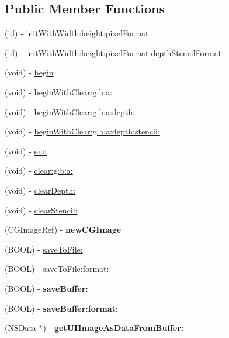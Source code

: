 \subsection*{Public Member Functions}
\begin{DoxyCompactItemize}
\item 
(id) -\/ \hyperlink{class_c_c_render_texture_a77581a363d799f8809e41af16b065430}{init\-With\-Width\-:height\-:pixel\-Format\-:}
\item 
(id) -\/ \hyperlink{class_c_c_render_texture_abec7e1e6f1d8364ede1ec35b80e8676b}{init\-With\-Width\-:height\-:pixel\-Format\-:depth\-Stencil\-Format\-:}
\item 
(void) -\/ \hyperlink{class_c_c_render_texture_a6ff1e0f1170a671213fa2318fe2cf9c2}{begin}
\item 
(void) -\/ \hyperlink{class_c_c_render_texture_a3f4c27a273867fccdba169c229c91d25}{begin\-With\-Clear\-:g\-:b\-:a\-:}
\item 
(void) -\/ \hyperlink{class_c_c_render_texture_a597c8f5c870d1e3ac01ec59ca116eaa8}{begin\-With\-Clear\-:g\-:b\-:a\-:depth\-:}
\item 
(void) -\/ \hyperlink{class_c_c_render_texture_abe5bc47d733370376b72b95f76b49b1b}{begin\-With\-Clear\-:g\-:b\-:a\-:depth\-:stencil\-:}
\item 
(void) -\/ \hyperlink{class_c_c_render_texture_a79e67a9ab6e86f790466d46ec20c7a7e}{end}
\item 
(void) -\/ \hyperlink{class_c_c_render_texture_a9be1084ec3e9296b555f3c970670aa1f}{clear\-:g\-:b\-:a\-:}
\item 
(void) -\/ \hyperlink{class_c_c_render_texture_ab970c383f371252cc9f016296189bbb5}{clear\-Depth\-:}
\item 
(void) -\/ \hyperlink{class_c_c_render_texture_a7cd182ca15a0c73135a2056af3bbe9e4}{clear\-Stencil\-:}
\item 
\hypertarget{class_c_c_render_texture_a1235f6cd1189581d0edca90a84737883}{(C\-G\-Image\-Ref) -\/ {\bfseries new\-C\-G\-Image}}\label{class_c_c_render_texture_a1235f6cd1189581d0edca90a84737883}

\item 
(B\-O\-O\-L) -\/ \hyperlink{class_c_c_render_texture_a6c6c723493a1ec9578b2ca4f27774ee7}{save\-To\-File\-:}
\item 
(B\-O\-O\-L) -\/ \hyperlink{class_c_c_render_texture_aad1bc8417cce99a3d936edb4e1a302b1}{save\-To\-File\-:format\-:}
\item 
\hypertarget{class_c_c_render_texture_a03397b4a3c463c0f96dd11770e3a7305}{(B\-O\-O\-L) -\/ {\bfseries save\-Buffer\-:}}\label{class_c_c_render_texture_a03397b4a3c463c0f96dd11770e3a7305}

\item 
\hypertarget{class_c_c_render_texture_a3ee9ad3c82cacb66ddf995ebe8dbf361}{(B\-O\-O\-L) -\/ {\bfseries save\-Buffer\-:format\-:}}\label{class_c_c_render_texture_a3ee9ad3c82cacb66ddf995ebe8dbf361}

\item 
\hypertarget{class_c_c_render_texture_a14db6c0d5295587f64f38d08a5570634}{(N\-S\-Data $\ast$) -\/ {\bfseries get\-U\-I\-Image\-As\-Data\-From\-Buffer\-:}}\label{class_c_c_render_texture_a14db6c0d5295587f64f38d08a5570634}

\end{DoxyCompactItemize}
